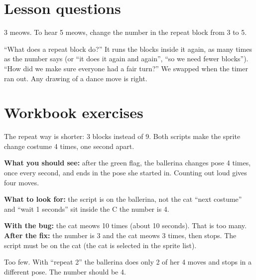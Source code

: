 
\section{Lesson questions}
\begin{answer}
3 meows. To hear 5 meows, change the number in the repeat block from 3 to 5.
\end{answer}

\begin{answer}[Reflection]
\enquote{What does a repeat block do?} It runs the blocks inside it again, as many times as the number says (or \enquote{it does it again and again}, \enquote{so we need fewer blocks}). \enquote{How did we make sure everyone had a fair turn?} We swapped when the timer ran out. Any drawing of a dance move is right.
\end{answer}

\section{Workbook exercises}
\begin{answer}
The repeat way is shorter: 3 blocks instead of 9. Both scripts make the sprite change costume 4 times, one second apart.
\end{answer}

\begin{answer}
\textbf{What you should see:} after the green flag, the ballerina changes pose 4 times, once every second, and ends in the pose she started in. Counting out loud gives four moves.

\textbf{What to look for:} \tickbox{} the script is on the ballerina, not the cat \quad \tickbox{} \enquote{next costume} and \enquote{wait 1 seconds} sit inside the C \quad \tickbox{} the number is 4.
\end{answer}

\begin{answer}
\textbf{With the bug:} the cat meows 10 times (about 10 seconds). That is too many. \textbf{After the fix:} the number is 3 and the cat meows 3 times, then stops. The script must be on the cat (the cat is selected in the sprite list).
\end{answer}

\begin{answer}
Too few. With \enquote{repeat 2} the ballerina does only 2 of her 4 moves and stops in a different pose. The number should be 4.
\end{answer}

